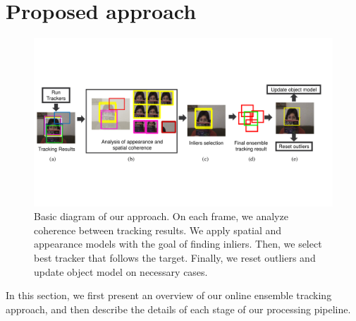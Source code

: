 \chapter{Proposed approach} %

\label{chapter2} %



\begin{figure}
\centering
\includegraphics[width=1\linewidth, trim= 0cm 5.1cm 1.3cm 5.3cm, clip=true]{Figures/diagram}
\caption{\small Basic diagram of our approach. On each frame, we analyze coherence
        between tracking results. We apply spatial and appearance models with
        the goal of finding inliers. Then, we select best tracker that follows
        the target. Finally, we reset outliers and  update object model on
        necessary cases.
}
\label{fig::diagram}
\end{figure}

In this section, we first present an overview of our online ensemble
tracking approach, and then describe the details of each stage of our
processing pipeline.

